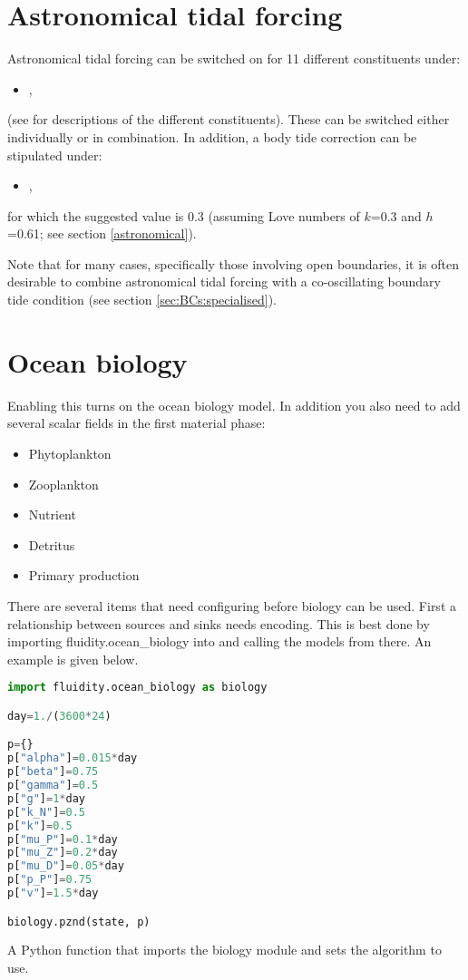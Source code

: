 \section{Astronomical tidal forcing}
\label{config:tides}

Astronomical tidal forcing can be switched on for 11 different constituents
under:
\begin{itemize}
\item {}, 
\end{itemize}
(see \citealp{Wells2008} for descriptions of
the different constituents). These can be switched either
individually or in combination. In addition, a body tide correction can be stipulated
under:
\begin{itemize}
\item {},
\end{itemize}
for which the suggested value is 0.3 (assuming 
Love numbers of $k$=0.3 and $h$=0.61; see section \ref{astronomical}).   

Note that for many cases, specifically those involving open boundaries, it is often
desirable to combine astronomical tidal forcing with a co-oscillating boundary tide condition
(see section \ref{sec:BCs:specialised}).

\section{Ocean biology}

Enabling this turns on the ocean biology model. In addition you also need to add several scalar fields in the first material phase:
\begin{itemize}
\item Phytoplankton
\item Zooplankton
\item Nutrient
\item Detritus
\item Primary production
\end{itemize}

There are several items that need configuring before biology can be used.
First a relationship between sources and sinks needs encoding. This is best
done by importing fluidity.ocean\_biology into
 and calling the
models from there. An example is given below.

\begin{example}
  \begin{lstlisting}[language=Python]
import fluidity.ocean_biology as biology

day=1./(3600*24)

p={}
p["alpha"]=0.015*day
p["beta"]=0.75
p["gamma"]=0.5
p["g"]=1*day
p["k_N"]=0.5
p["k"]=0.5
p["mu_P"]=0.1*day
p["mu_Z"]=0.2*day
p["mu_D"]=0.05*day
p["p_P"]=0.75
p["v"]=1.5*day

biology.pznd(state, p)  
  \end{lstlisting}
  \caption{A Python function that imports the biology module and sets the algorithm to use.}
\end{example}

